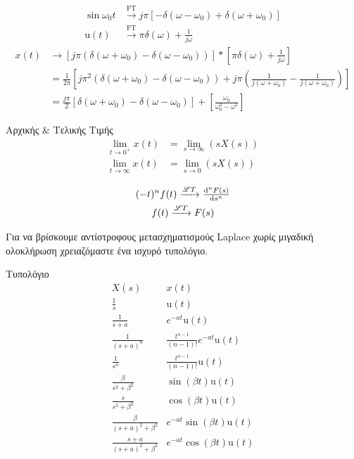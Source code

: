 \documentclass[11pt,a4paper,titlepage,fleqn]{article}
\begin{document}
    \begin{align*}
    \sin\omega_0 t &\xrightarrow{\mathrm{FT}} j\pi\left[
    -\delta(\omega-\omega_0)+\delta(\omega +\omega_0)
    \right] \\
    \mathrm u(t) &\xrightarrow{\mathrm{FT}} \pi\delta(\omega )+\frac{1}{j\omega }
    \end{align*}
    \begin{align*}
    x(t) &\to \left[
    j\pi\left(\delta(\omega +\omega_0)-\delta(\omega -\omega_0) \right)
    \right] * \left[
    \pi\delta(\omega )+\frac{1}{j\omega }
    \right] \\
    &= \frac{1}{2\pi}\left[
    j\pi^2\left(
    \delta(\omega+\omega_0)-\delta(\omega-\omega_0)
    \right) +j\pi\left(
    \frac{1}{j(\omega+\omega_0)}-\frac{1}{j(\omega+\omega_0)}
    \right)    \right]
    \\ &= \frac{j\pi}{2}\left[
    \delta(\omega +\omega_0)-\delta(\omega-\omega_0)\right]+\left[
    \frac{\omega_0}{\omega_0^2-\omega^2}
    \right] 
    \end{align*}
    
    \begin{theorem*}[title=Θεωρήματα Αρχικής \& Τελικής Τιμής,width=.5\textwidth]%
    	{Αρχικής \& Τελικής Τιμής}
    \begin{align*}
    \lim_{t\to 0^+} x(t) &= \lim_{s\to \infty} \left( sX(s) \right) \\
    \lim_{t\to \infty} x(t) &= \lim_{s\to 0} \left( sX(s) \right)
    \end{align*}
    \end{theorem*}
    
    \begin{gather*}
    (-t)^n f(t) \xrightarrow{\mathscr L T} \od[n]{F(s)}{s} \\
    f(t) \xrightarrow{\mathscr L T} F(s)
    \end{gather*}
    
    Για να βρίσκουμε αντίστροφους μετασχηματισμούς Laplace χωρίς μιγαδική
    ολοκλήρωση χρειαζόμαστε ένα ισχυρό τυπολόγιο.
    
    \begin{infobox}{Τυπολόγιο}
    \[
    \begin{array}{cc}
    	X(s) & x(t) \\ \hline
    	\frac{1}{s} & \mathrm u(t) \\ \hline
    	\frac{1}{s+a} & e^{-at}\mathrm u(t) \\ \hline
    	\frac{1}{(s+a)^n} & \frac{t^{n-1}}{(n-1)!}e^{-at}\mathrm u(t) \\ \hline
    	\frac{1}{s^n} & \frac{t^{n-1}}{(n-1)!}\mathrm u(t) \\ \hline
    	\frac{\beta}{s^2+\beta^2} & \sin(\beta t)\mathrm u(t) \\ \hline
    	\frac{s}{s^2+\beta^2} & \cos(\beta t)\mathrm u(t) \\ \hline
    	\frac{\beta}{(s+a)^2+\beta^2} & e^{-at}\sin(\beta t)\mathrm u(t) \\ \hline
    	\frac{s+a}{(s+a)^2+\beta^2} & e^{-at}\cos(\beta t)\mathrm u(t)
    \end{array}
    \]
    \end{infobox}
    
\end{document}
